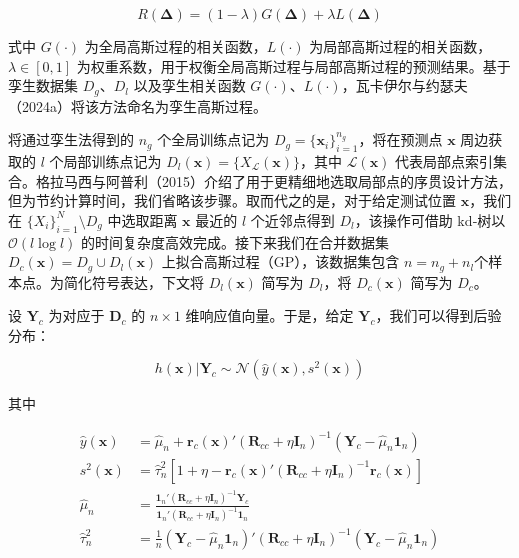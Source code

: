\documentclass{ctexart}
\begin{document}
\begin{equation*}
R(\boldsymbol{\Delta})=(1-\lambda)G(\boldsymbol{\Delta})+\lambda L(\boldsymbol{\Delta})
\tag{11.8}
\end{equation*}

式中 $G(\cdot)$ 为全局高斯过程的相关函数，$L(\cdot)$ 为局部高斯过程的相关函数，$\lambda\in[0,1]$ 为权重系数，用于权衡全局高斯过程与局部高斯过程的预测结果。基于孪生数据集 $D_g$、$D_l$ 以及孪生相关函数 $G(\cdot)$、$L(\cdot)$，瓦卡伊尔与约瑟夫（2024a）将该方法命名为孪生高斯过程。

将通过孪生法得到的 $n_g$ 个全局训练点记为 $D_g=\{\boldsymbol{x}_i\}_{i=1}^{n_g}$，将在预测点 $\boldsymbol{x}$ 周边获取的 $l$ 个局部训练点记为 $D_l(\boldsymbol{x})=\{X_{\mathcal{L}}(\boldsymbol{x})\}$，其中 $\mathcal{L}(\boldsymbol{x})$ 代表局部点索引集合。格拉马西与阿普利（2015）介绍了用于更精细地选取局部点的序贯设计方法，但为节约计算时间，我们省略该步骤。取而代之的是，对于给定测试位置 $\boldsymbol{x}$，我们在 $\{X_i\}_{i=1}^{N}\setminus D_g$ 中选取距离 $\boldsymbol{x}$ 最近的 $l$ 个近邻点得到 $D_l$，该操作可借助 kd‑树以 $\mathcal{O}(l\log l)$ 的时间复杂度高效完成。接下来我们在合并数据集 $D_c(\boldsymbol{x})=D_g\cup D_l(\boldsymbol{x})$ 上拟合高斯过程（GP），该数据集包含 $n=n_g+n_l$个样本点。为简化符号表达，下文将 $D_l(\boldsymbol{x})$ 简写为 $D_l$，将 $D_c(\boldsymbol{x})$ 简写为 $D_c$。

设 $\boldsymbol{Y}_c$ 为对应于 $\boldsymbol{D}_c$ 的 $n\times1$ 维响应值向量。于是，给定 $\boldsymbol{Y}_c$，我们可以得到后验分布：

\begin{equation*}
h(\boldsymbol{x})|\boldsymbol{Y}_c\sim\mathcal{N}(\widehat{y}(\boldsymbol{x}),s^2(\boldsymbol{x}))
\end{equation*}

其中

\begin{align*}
\widehat{y}(\boldsymbol{x})&=\widehat{\mu}_n+\boldsymbol{r}_c(\boldsymbol{x})'(\boldsymbol{R}_{cc}+\eta\boldsymbol{I}_n)^{-1}(\boldsymbol{Y}_c-\widehat{\mu}_n\boldsymbol{1}_n)\\
s^2(\boldsymbol{x})&=\widehat{\tau}_n^2[1+\eta-\boldsymbol{r}_c(\boldsymbol{x})'(\boldsymbol{R}_{cc}+\eta\boldsymbol{I}_n)^{-1}\boldsymbol{r}_c(\boldsymbol{x})]\\
\widehat{\mu}_n&=\frac{\boldsymbol{1}_n'(\boldsymbol{R}_{cc}+\eta\boldsymbol{I}_n)^{-1}\boldsymbol{Y}_c}{\boldsymbol{1}_n'(\boldsymbol{R}_{cc}+\eta\boldsymbol{I}_n)^{-1}\boldsymbol{1}_n}\\
\widehat{\tau}_n^2&=\frac{1}{n}(\boldsymbol{Y}_c-\widehat{\mu}_n\boldsymbol{1}_n)'(\boldsymbol{R}_{cc}+\eta\boldsymbol{I}_n)^{-1}(\boldsymbol{Y}_c-\widehat{\mu}_n\boldsymbol{1}_n)
\end{align*}
\end{document}
